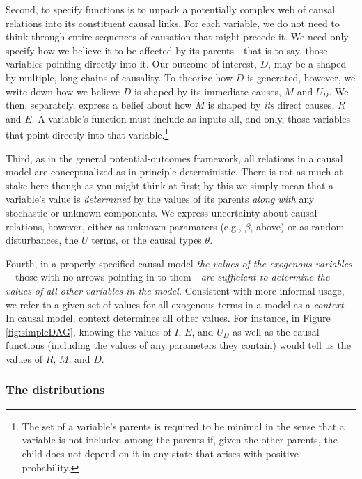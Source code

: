 \documentclass[12pt,]{book}
\let\rmarkdownfootnote\footnote%
\def\footnote{\protect\rmarkdownfootnote}
\begin{document}
Second, to specify functions is to unpack a potentially complex web of causal relations into its constituent causal links. For each variable, we do not need to think through entire sequences of causation that might precede it. We need only specify how we believe it to be affected by its parents---that is to say, those variables pointing directly into it. Our outcome of interest, \(D\), may be a shaped by multiple, long chains of causality. To theorize how \(D\) is generated, however, we write down how we believe \(D\) is shaped by its immediate causes, \(M\) and \(U_D\). We then, separately, express a belief about how \(M\) is shaped by \emph{its} direct causes, \(R\) and \(E\). A variable's function must include as inputs all, and only, those variables that point directly into that variable.\footnote{The set of a variable's parents is required to be minimal in the sense that a variable is not included among the parents if, given the other parents, the child does not depend on it in any state that arises with positive probability.}

Third, as in the general potential-outcomes framework, all relations in a causal model are conceptualized as in principle deterministic. There is not as much at stake here though as you might think at first; by this we simply mean that a variable's value is \emph{determined} by the values of its parents \emph{along with} any stochastic or unknown components. We express uncertainty about causal relations, however, either as unknown paramaters (e.g., \(\beta\), above) or as random disturbances, the \(U\) terms, or the causal types \(\theta\).

Fourth, in a properly specified causal model \emph{the values of the exogenous variables}---those with no arrows pointing in to them---\emph{are sufficient to determine the values of all other variables in the model.} Consistent with more informal usage, we refer to a given set of values for all exogenous terms in a model as a \emph{context}. In causal model, context determines all other values. For instance, in Figure \ref{fig:simpleDAG}, knowing the values of \(I\), \(E\), and \(U_D\) as well as the causal functions (including the values of any parameters they contain) would tell us the values of \(R\), \(M\), and \(D\).

\hypertarget{the-distributions}{%
\subsubsection{The distributions}\label{the-distributions}}
\end{document}
